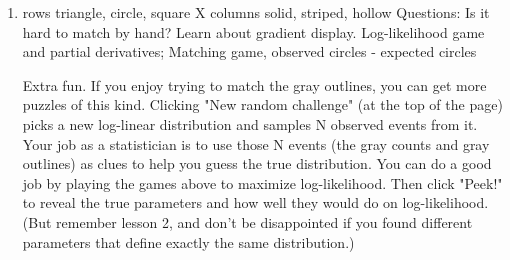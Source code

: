 \documentclass[11pt,letterpaper]{article}
\begin{document}
{\begin{enumerate}
\item %
rows {triangle, circle, square} X columns {solid, striped, hollow}
Questions: Is it hard to match by hand?  Learn about gradient display.
Log-likelihood game and partial derivatives; Matching game, observed circles - expected circles

Extra fun. If you enjoy trying to match the gray outlines, you can get more puzzles of this kind. Clicking "New random challenge" (at the top of the page) picks a new log-linear distribution and samples N observed events from it. Your job as a statistician is to use those N events (the gray counts and gray outlines) as clues to help you guess the true distribution. You can do a good job by playing the games above to maximize log-likelihood. Then click "Peek!" to reveal the true parameters and how well they would do on log-likelihood. (But remember lesson 2, and don't be disappointed if you found different parameters that define exactly the same distribution.)


\end{enumerate}}
\end{document}
